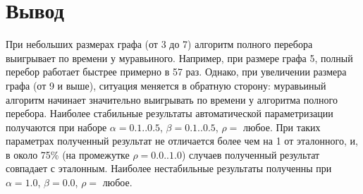 \section*{Вывод}

При небольших размерах графа (от 3 до 7) алгоритм полного перебора выигрывает по времени у муравьиного. Например, при размере графа 5, полный перебор работает быстрее примерно в 57 раз. Однако, при увеличении размера графа (от 9 и выше), ситуация меняется в обратную сторону: муравьиный алгоритм начинает значительно выигрывать по времени у алгоритма полного перебора. 
Наиболее стабильные результаты автоматической параметризации получаются при наборе $\alpha = 0.1..0.5$, $\beta = 0.1..0.5$, $\rho = $ любое. При таких параметрах полученный результат не отличается более чем на 1 от эталонного, и, в около 75\% (на промежутке $\rho = 0.0..1.0$) случаев полученный результат совпадает с эталонным. Наиболее нестабильные результаты полученны при $\alpha = 1.0$, $\beta = 0.0$, $\rho = $ любое.


